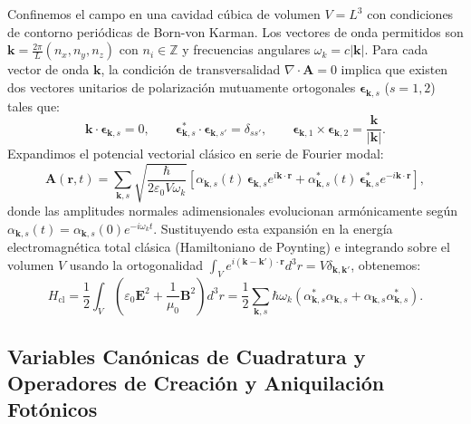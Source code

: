 \documentclass[11pt,a4paper,twoside]{report}
\theoremstyle{definition}
\theoremstyle{plain}
\theoremstyle{remark}
\begin{document}
Confinemos el campo en una cavidad cúbica de volumen $V = L^3$ con condiciones de contorno periódicas de Born-von Karman. Los vectores de onda permitidos son $\bm{k} = \frac{2\pi}{L}(n_x, n_y, n_z)$ con $n_i \in \mathbb{Z}$ y frecuencias angulares $\omega_k = c|\bm{k}|$. Para cada vector de onda $\bm{k}$, la condición de transversalidad $\nabla \cdot \bm{A} = 0$ implica que existen dos vectores unitarios de polarización mutuamente ortogonales $\bm{\epsilon}_{\bm{k},s}$ ($s = 1, 2$) tales que:
\begin{equation}
    \bm{k} \cdot \bm{\epsilon}_{\bm{k},s} = 0, \qquad \bm{\epsilon}_{\bm{k},s}^* \cdot \bm{\epsilon}_{\bm{k},s'} = \delta_{ss'}, \qquad \bm{\epsilon}_{\bm{k},1} \times \bm{\epsilon}_{\bm{k},2} = \frac{\bm{k}}{|\bm{k}|}.
\end{equation}
Expandimos el potencial vectorial clásico en serie de Fourier modal:
\begin{equation}
    \bm{A}(\bm{r},t) = \sum_{\bm{k}, s} \sqrt{\frac{\hbar}{2\varepsilon_0 V \omega_k}} \left[ \alpha_{\bm{k},s}(t)\,\bm{\epsilon}_{\bm{k},s} e^{i\bm{k}\cdot\bm{r}} + \alpha_{\bm{k},s}^*(t)\,\bm{\epsilon}_{\bm{k},s}^* e^{-i\bm{k}\cdot\bm{r}} \right],
\end{equation}
donde las amplitudes normales adimensionales evolucionan armónicamente según $\alpha_{\bm{k},s}(t) = \alpha_{\bm{k},s}(0)e^{-i\omega_k t}$. Sustituyendo esta expansión en la energía electromagnética total clásica (Hamiltoniano de Poynting) e integrando sobre el volumen $V$ usando la ortogonalidad $\int_V e^{i(\bm{k}-\bm{k}')\cdot\bm{r}}d^3r = V\delta_{\bm{k},\bm{k}'}$, obtenemos:
\begin{equation}
    H_{\text{cl}} = \frac{1}{2}\int_V \left( \varepsilon_0 \bm{E}^2 + \frac{1}{\mu_0}\bm{B}^2 \right) d^3r = \frac{1}{2}\sum_{\bm{k},s} \hbar\omega_k \left( \alpha_{\bm{k},s}^* \alpha_{\bm{k},s} + \alpha_{\bm{k},s}\alpha_{\bm{k},s}^* \right).
\end{equation}

\subsection{Variables Canónicas de Cuadratura y Operadores de Creación y Aniquilación Fotónicos}
\end{document}
